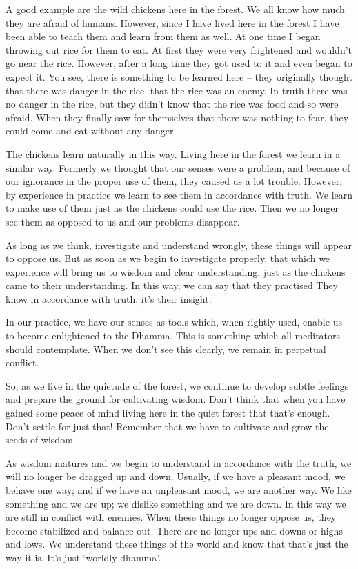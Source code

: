 A good example are the wild chickens here in the forest. We all know how much they are afraid of humans. However, since I have lived here in the forest I have been able to teach them and learn from them as well. At one time I began throwing out rice for them to eat. At first they were very frightened and wouldn't go near the rice. However, after a long time they got used to it and even began to expect it. You see, there is something to be learned here -- they originally thought that there was danger in the rice, that the rice was an enemy. In truth there was no danger in the rice, but they didn't know that the rice was food and so were afraid. When they finally saw for themselves that there was nothing to fear, they could come and eat without any danger.

The chickens learn naturally in this way. Living here in the forest we learn in a similar way. Formerly we thought that our senses were a problem, and because of our ignorance in the proper use of them, they caused us a lot trouble. However, by experience in practice we learn to see them in accordance with truth. We learn to make use of them just as the chickens could use the rice. Then we no longer see them as opposed to us and our problems disappear.

As long as we think, investigate and understand wrongly, these things will appear to oppose us. But as soon as we begin to investigate properly, that which we experience will bring us to wisdom and clear understanding, just as the chickens came to their understanding. In this way, we can say that they practised  They know in accordance with truth, it's their insight.

In our practice, we have our senses as tools which, when rightly used, enable us to become enlightened to the Dhamma. This is something which all meditators should contemplate. When we don't see this clearly, we remain in perpetual conflict.

So, as we live in the quietude of the forest, we continue to develop subtle feelings and prepare the ground for cultivating wisdom. Don't think that when you have gained some peace of mind living here in the quiet forest that that's enough. Don't settle for just that! Remember that we have to cultivate and grow the seeds of wisdom.

As wisdom matures and we begin to understand in accordance with the truth, we will no longer be dragged up and down. Usually, if we have a pleasant mood, we behave one way; and if we have an unpleasant mood, we are another way. We like something and we are up; we dislike something and we are down. In this way we are still in conflict with enemies. When these things no longer oppose us, they become stabilized and balance out. There are no longer ups and downs or highs and lows. We understand these things of the world and know that that's just the way it is. It's just `worldly dhamma'.

